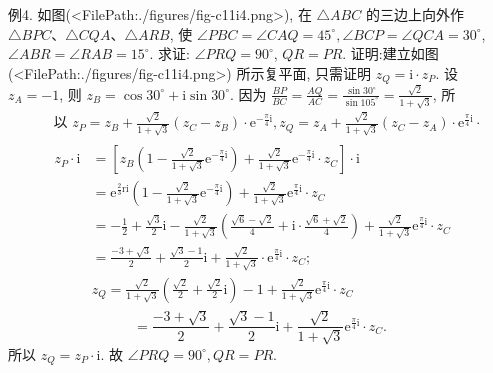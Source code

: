 例4. 如图(<FilePath:./figures/fig-c11i4.png>), 在 $\triangle A B C$ 的三边上向外作 $\triangle B P C 、 \triangle C Q A 、 \triangle A R B$, 使 $\angle P B C= \angle C A Q=45^{\circ}, \angle B C P=\angle Q C A=30^{\circ}$, $\angle A B R=\angle R A B=15^{\circ}$. 求证: $\angle P R Q=90^{\circ}$, $Q R=P R$.
证明:建立如图(<FilePath:./figures/fig-c11i4.png>) 所示复平面, 只需证明 $z_Q=\mathrm{i} \cdot z_P$.
设 $z_A=-1$, 则 $z_B=\cos 30^{\circ}+\mathrm{i} \sin 30^{\circ}$.
因为 $\frac{B P}{B C}=\frac{A Q}{A C}=\frac{\sin 30^{\circ}}{\sin 105^{\circ}}=\frac{\sqrt{2}}{1+\sqrt{3}}$, 所
$$
\begin{aligned}
& \text { 以 } z_P=z_B+\frac{\sqrt{2}}{1+\sqrt{3}}\left(z_C-z_B\right) \cdot \mathrm{e}^{-\frac{\pi}{4} \mathrm{i}}, z_Q=z_A+\frac{\sqrt{2}}{1+\sqrt{3}}\left(z_C-z_A\right) \cdot \mathrm{e}^{\frac{\pi}{4} \mathrm{i}} \cdot \\
& \begin{aligned}
z_P \cdot \mathrm{i} & =\left[z_B\left(1-\frac{\sqrt{2}}{1+\sqrt{3}} \mathrm{e}^{-\frac{\pi}{4} \mathrm{i}}\right)+\frac{\sqrt{2}}{1+\sqrt{3}} \mathrm{e}^{-\frac{\pi}{4} \mathrm{i}} \cdot z_C\right] \cdot \mathrm{i} \\
& =\mathrm{e}^{\frac{2}{3} \mathrm{ri}}\left(1-\frac{\sqrt{2}}{1+\sqrt{3}} \mathrm{e}^{-\frac{\pi}{4} \mathrm{i}}\right)+\frac{\sqrt{2}}{1+\sqrt{3}} \mathrm{e}^{\frac{\pi}{4} \mathrm{i}} \cdot z_C \\
& =-\frac{1}{2}+\frac{\sqrt{3}}{2} \mathrm{i}-\frac{\sqrt{2}}{1+\sqrt{3}}\left(\frac{\sqrt{6}-\sqrt{2}}{4}+\mathrm{i} \cdot \frac{\sqrt{6}+\sqrt{2}}{4}\right)+\frac{\sqrt{2}}{1+\sqrt{3}} \mathrm{e}^{\frac{\pi}{4} \mathrm{i}} \cdot z_C \\
& =\frac{-3+\sqrt{3}}{2}+\frac{\sqrt{3}-1}{2} \mathrm{i}+\frac{\sqrt{2}}{1+\sqrt{3}} \cdot \mathrm{e}^{\frac{\pi}{4} \mathrm{i}} \cdot z_C ; \\
& z_Q=\frac{\sqrt{2}}{1+\sqrt{3}}\left(\frac{\sqrt{2}}{2}+\frac{\sqrt{2}}{2} \mathrm{i}\right)-1+\frac{\sqrt{2}}{1+\sqrt{3}} \mathrm{e}^{\frac{\pi}{4} \mathrm{i}} \cdot z_C
\end{aligned}
\end{aligned}
$$
$$
=\frac{-3+\sqrt{3}}{2}+\frac{\sqrt{3}-1}{2} \mathrm{i}+\frac{\sqrt{2}}{1+\sqrt{3}} \mathrm{e}^{\frac{\pi}{4} \mathrm{i}} \cdot z_C .
$$
所以 $z_Q=z_P \cdot \mathrm{i}$.
故 $\angle P R Q=90^{\circ}, Q R=P R$.



